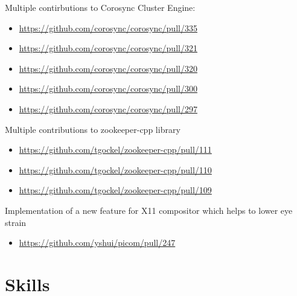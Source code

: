 \documentclass[12]{article}
\begin{document}
{
Multiple contirbutions to Corosync Cluster Engine:
\begin{itemize}
	\item \url{https://github.com/corosync/corosync/pull/335}
	\item \url{https://github.com/corosync/corosync/pull/321}
	\item \url{https://github.com/corosync/corosync/pull/320}
	\item \url{https://github.com/corosync/corosync/pull/300}
	\item \url{https://github.com/corosync/corosync/pull/297}
\end{itemize}
}

{
Multiple contributions to zookeeper-cpp library
\begin{itemize}
	\item \url{https://github.com/tgockel/zookeeper-cpp/pull/111}
	\item \url{https://github.com/tgockel/zookeeper-cpp/pull/110}
	\item \url{https://github.com/tgockel/zookeeper-cpp/pull/109}
\end{itemize}
}

{
Implementation of a new feature for X11 compositor which helps to lower eye strain
\begin{itemize}
	\item \url{https://github.com/yshui/picom/pull/247}
\end{itemize}
}

\section{Skills}
\end{document}

